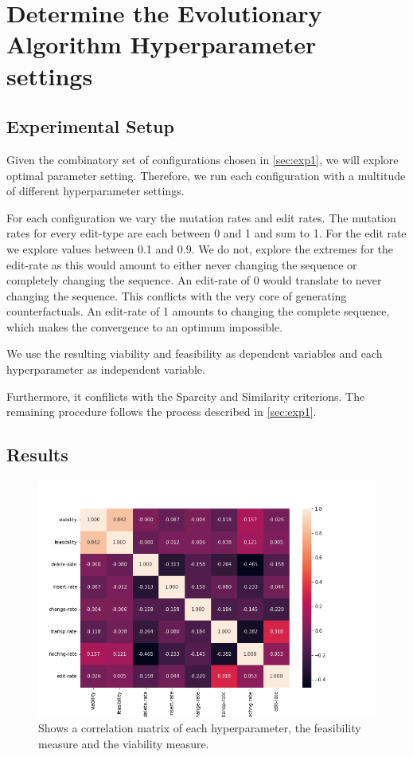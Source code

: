 \documentclass[./../../paper.tex]{subfiles}
\begin{document}
\section{Determine the Evolutionary Algorithm Hyperparameter settings}

\subsection{Experimental Setup}
\label{sec:exp2}
Given the combinatory set of configurations chosen in \autoref{sec:exp1}, we will explore optimal parameter setting. Therefore, we run each configuration with a multitude of different hyperparameter settings. 

For each configuration we vary the mutation rates and edit rates. The mutation rates for every edit-type are each between 0 and 1 and sum to 1. For the edit rate we explore values between 0.1 and 0.9. We do not, explore the extremes for the edit-rate as this would amount to either never changing the sequence or completely changing the sequence. An edit-rate of 0 would translate to never changing the sequence. This conflicts with the very core of generating counterfactuals. An edit-rate of 1 amounts to changing the complete sequence, which makes the convergence to an optimum impossible. 

We use the resulting viability and feasibility as dependent variables and each hyperparameter as independent variable.

Furthermore, it confilicts with the Sparcity and Similarity criterions. The remaining procedure follows the process described in \autoref{sec:exp1}.


\subsection{Results}

\begin{figure}
    \centering
    \includegraphics[width=\textwidth]{figures/results/params_heatmap.png}
    \caption{Shows a correlation matrix of each hyperparameter, the feasibility measure and the viability measure.}
    \label{fig:param_results_1}
\end{figure}
\end{document}
